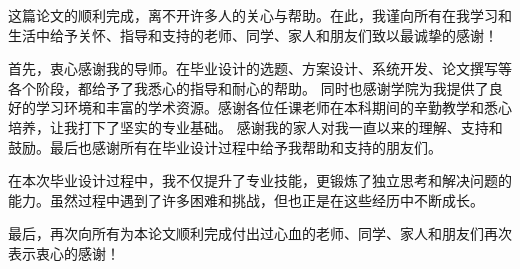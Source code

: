 
\begin{thankscontent}
    这篇论文的顺利完成，离不开许多人的关心与帮助。在此，我谨向所有在我学习和生活中给予关怀、指导和支持的老师、同学、家人和朋友们致以最诚挚的感谢！

    首先，衷心感谢我的导师。在毕业设计的选题、方案设计、系统开发、论文撰写等各个阶段，都给予了我悉心的指导和耐心的帮助。
    同时也感谢学院为我提供了良好的学习环境和丰富的学术资源。感谢各位任课老师在本科期间的辛勤教学和悉心培养，让我打下了坚实的专业基础。
    感谢我的家人对我一直以来的理解、支持和鼓励。最后也感谢所有在毕业设计过程中给予我帮助和支持的朋友们。

    在本次毕业设计过程中，我不仅提升了专业技能，更锻炼了独立思考和解决问题的能力。虽然过程中遇到了许多困难和挑战，但也正是在这些经历中不断成长。

    最后，再次向所有为本论文顺利完成付出过心血的老师、同学、家人和朋友们再次表示衷心的感谢！
\end{thankscontent}